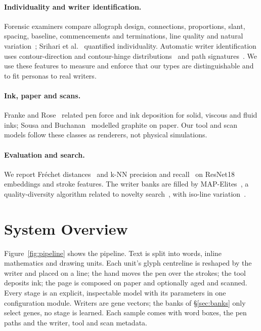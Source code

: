 \documentclass[10pt,twocolumn]{article}
\begin{document}
\paragraph{Individuality and writer identification.} Forensic examiners compare allograph design, connections,
proportions, slant, spacing, baseline, commencements and terminations, line quality and natural
variation~\cite{huber1999}; Srihari et al.~\cite{srihari2002} quantified individuality. Automatic writer
identification uses contour-direction and contour-hinge distributions~\cite{schomaker2004,bulacu2007} and path
signatures~\cite{lai2019,chen1957,lyons1998}. We use these features to measure and enforce that our types are
distinguishable and to fit personas to real writers.

\paragraph{Ink, paper and scans.} Franke and Rose~\cite{franke2004} related pen force and ink deposition for solid,
viscous and fluid inks; Sousa and Buchanan~\cite{sousa1999} modelled graphite on paper. Our tool and scan models
follow these classes as renderers, not physical simulations.

\paragraph{Evaluation and search.} We report Fr\'echet distances~\cite{heusel2017} and k-NN precision and
recall~\cite{kynkaanniemi2019} on ResNet18~\cite{he2016} embeddings and stroke features. The writer banks are filled
by MAP-Elites~\cite{mouret2015}, a quality-diversity algorithm related to novelty search~\cite{lehman2011}, with
iso-line variation~\cite{vassiliades2018}.

\section{System Overview}
\label{sec:overview}

Figure~\ref{fig:pipeline} shows the pipeline. Text is split into words, inline mathematics and drawing units.
Each unit's glyph centreline is reshaped by the writer and placed on a line; the hand moves the pen over the
strokes; the tool deposits ink; the page is composed on paper and optionally aged and scanned. Every stage is an
explicit, inspectable model with its parameters in one configuration module. Writers are gene vectors; the banks
of \S\ref{sec:banks} only select genes, no stage is learned. Each sample comes with word boxes, the pen paths and
the writer, tool and scan metadata.
\end{document}
